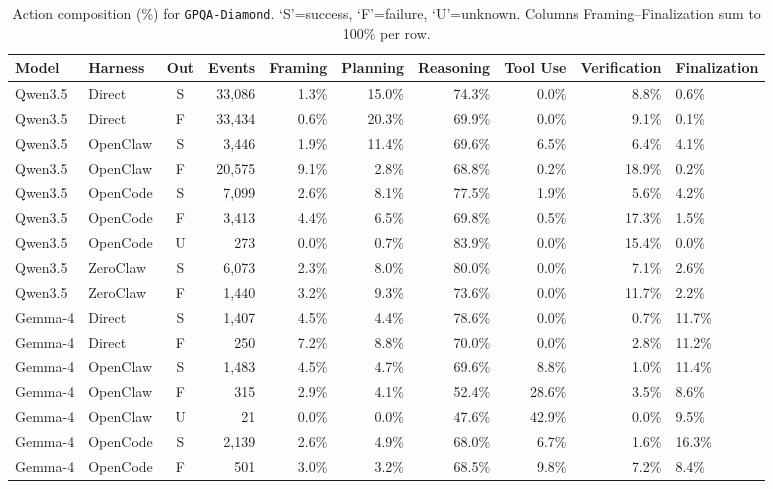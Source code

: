 \begin{table}[t]
\centering
\fontsize{7.5}{8.5}\selectfont
\renewcommand{\arraystretch}{1.12}
\setlength{\tabcolsep}{3.5pt}
\caption{Action composition (\%) for \texttt{GPQA-Diamond}. `S'=success, `F'=failure, `U'=unknown. Columns Framing--Finalization sum to 100\% per row.}
\label{tab:action-gpqa}
\vspace{-2pt}
\begin{tabular}{@{}llcrrrrrr@{}}
\toprule
Model & Harness & Out & Events & Framing & Planning & Reasoning & Tool Use & Verification & Finalization \\
\midrule
  Qwen3.5 & Direct & S & 33,086 & 1.3\% & 15.0\% & 74.3\% & 0.0\% & 8.8\% & 0.6\% \\
  Qwen3.5 & Direct & F & 33,434 & 0.6\% & 20.3\% & 69.9\% & 0.0\% & 9.1\% & 0.1\% \\
  Qwen3.5 & OpenClaw & S & 3,446 & 1.9\% & 11.4\% & 69.6\% & 6.5\% & 6.4\% & 4.1\% \\
  Qwen3.5 & OpenClaw & F & 20,575 & 9.1\% & 2.8\% & 68.8\% & 0.2\% & 18.9\% & 0.2\% \\
  Qwen3.5 & OpenCode & S & 7,099 & 2.6\% & 8.1\% & 77.5\% & 1.9\% & 5.6\% & 4.2\% \\
  Qwen3.5 & OpenCode & F & 3,413 & 4.4\% & 6.5\% & 69.8\% & 0.5\% & 17.3\% & 1.5\% \\
  Qwen3.5 & OpenCode & U & 273 & 0.0\% & 0.7\% & 83.9\% & 0.0\% & 15.4\% & 0.0\% \\
  Qwen3.5 & ZeroClaw & S & 6,073 & 2.3\% & 8.0\% & 80.0\% & 0.0\% & 7.1\% & 2.6\% \\
  Qwen3.5 & ZeroClaw & F & 1,440 & 3.2\% & 9.3\% & 73.6\% & 0.0\% & 11.7\% & 2.2\% \\
\midrule
  Gemma-4 & Direct & S & 1,407 & 4.5\% & 4.4\% & 78.6\% & 0.0\% & 0.7\% & 11.7\% \\
  Gemma-4 & Direct & F & 250 & 7.2\% & 8.8\% & 70.0\% & 0.0\% & 2.8\% & 11.2\% \\
  Gemma-4 & OpenClaw & S & 1,483 & 4.5\% & 4.7\% & 69.6\% & 8.8\% & 1.0\% & 11.4\% \\
  Gemma-4 & OpenClaw & F & 315 & 2.9\% & 4.1\% & 52.4\% & 28.6\% & 3.5\% & 8.6\% \\
  Gemma-4 & OpenClaw & U & 21 & 0.0\% & 0.0\% & 47.6\% & 42.9\% & 0.0\% & 9.5\% \\
  Gemma-4 & OpenCode & S & 2,139 & 2.6\% & 4.9\% & 68.0\% & 6.7\% & 1.6\% & 16.3\% \\
  Gemma-4 & OpenCode & F & 501 & 3.0\% & 3.2\% & 68.5\% & 9.8\% & 7.2\% & 8.4\% \\

\end{tabular}
\end{table}
